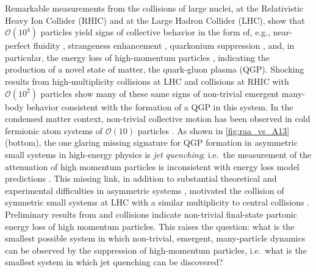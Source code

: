 \documentclass[%
 reprint,
 amsmath,amssymb,
 aps,
 prl,nofootinbib,
 superscriptaddress
]{revtex4-2}
\begin{document}
 Remarkable measurements from the collisions of large nuclei, \auau{} at the Relativistic Heavy Ion Collider (RHIC) and \pbpb{} at the Large Hadron Collider (LHC), show that $\mathcal{O}(10^4)$ particles yield signs of collective behavior in the form of, e.g., near-perfect fluidity \cite{STAR:2000ekf,PHENIX:2003qra,ALICE:2010suc}, strangeness enhancement \cite{STAR:2003jis,ALICE:2013xmt}, quarkonium suppression \cite{STAR:2009irl,ALICE:2012jsl,CMS:2012bms},  and, in particular, the energy loss of high-momentum particles \cite{ALICE:2010yje,ALICE:2012ab,CMS:2012aa}, indicating the production of a novel state of matter, the quark-gluon plasma (QGP). Shocking results from high-multiplicity \ppb{} collisions at LHC \cite{ATLAS:2012cix, ALICE:2012eyl, CMS:2012qk, ALICE:2016sdt, ATLAS:2013jmi, ALICE:2014dwt,CMS:2015yux,CMS:2018loe,ATLAS:2019pvn,ALICE:2024vzv} and \pdhau{} collisions at RHIC \cite{PHENIX:2018lia, STAR:2022pfn} with $\mathcal{O}(10^2)$ particles show many of these same signs of non-trivial emergent many-body behavior consistent with the formation of a QGP in this system.
In the condensed matter context, non-trivial collective motion has been observed in cold fermionic atom systems of $\mathcal{O}(10)$ particles \cite{Brandstetter:2023jsy}.
As shown in \cref{fig:raa_vs_A13} (bottom), the one glaring missing signature for QGP formation in asymmetric small systems in high-energy physics is \textit{jet quenching}; i.e.\ the measurement of the attenuation of high momentum particles is inconsistent with energy loss model predictions \cite{ALICE:2014xsp,ATLAS:2022iyq,CMS:2025jbv}. This missing link, in addition to substantial theoretical and experimental difficulties in asymmetric systems \cite{Alvioli:2013vk, ALICE:2014xsp, Kordell:2016njg, Perepelitsa:2024eik, JETSCAPE:2024dgu}, motivated the collision of symmetric small systems at LHC with a similar multiplicity to central \ppb{} collisions \cite{Citron:2018lsq, Huss:2020dwe,Huss:2020whe, Brewer:2021kiv}. Preliminary results from \oo{} \cite{ALICEOOprelim,CMS:2025bta} and \nene{} \cite{2969907} collisions indicate non-trivial final-state partonic energy loss of high momentum particles. 
This raises the question: what is the smallest possible system in which non-trivial, emergent, many-particle dynamics can be observed by the suppression of high-momentum particles, i.e.\ what is the smallest system in which jet quenching can be discovered?
\end{document}
